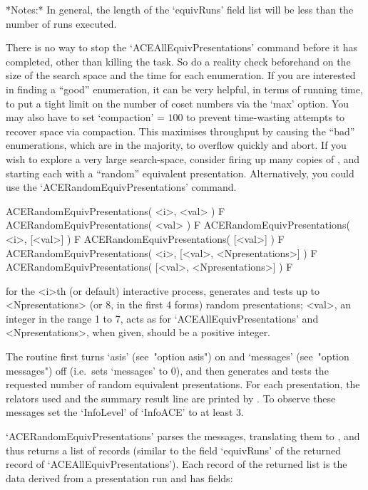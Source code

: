 \enditems

*Notes:*
In general, the length of the `equivRuns' field list will be less than
the number of runs executed.

There is no way to stop the `ACEAllEquivPresentations' command  before
it has completed, other than killing the task. So do a  reality  check
beforehand on the size of the search  space  and  the  time  for  each
enumeration. If you are interested in finding a ``good''  enumeration,
it can be very helpful, in terms of running time, to put a tight limit
on the number of coset numbers via the `max' option. You may also have
to set `compaction'  =  $100$  to  prevent  time-wasting  attempts  to
recover space via compaction. This maximises throughput by causing the
``bad'' enumerations, which are in the majority, to  overflow  quickly
and abort. If you wish to explore a very large search-space,  consider
firing up many copies of {\ACE}, and starting each with  a  ``random''
equivalent   presentation.   Alternatively,   you   could   use    the
`ACERandomEquivPresentations' command.


\>ACERandomEquivPresentations( <i>, <val> ) F
\>ACERandomEquivPresentations( <val> ) F
\>ACERandomEquivPresentations( <i>, [<val>] ) F
\>ACERandomEquivPresentations( [<val>] ) F
\>ACERandomEquivPresentations( <i>, [<val>, <Npresentations>] ) F
\>ACERandomEquivPresentations( [<val>, <Npresentations>] ) F

for the <i>th (or default) interactive {\ACE} process,  generates  and
tests up to <Npresentations> (or 8,  in  the  first  4  forms)  random
presentations; <val>, an integer in the range 1  to  7,  acts  as  for
`ACEAllEquivPresentations' and <Npresentations>, when given, should be
a positive integer.

The routine first turns `asis' (see~"option asis") on  and  `messages'
(see~"option messages") off (i.e.~sets  `messages'  to  0),  and  then
generates  and  tests  the  requested  number  of  random   equivalent
presentations. For  each  presentation,  the  relators  used  and  the
summary result line are printed by {\ACE}. To observe  these  messages
set the `InfoLevel' of `InfoACE' to at least 3.

`ACERandomEquivPresentations' parses the {\ACE} messages,  translating
them to {\GAP}, and thus returns a list of  records  (similar  to  the
field     `equivRuns'     of     the      returned      record      of
`ACEAllEquivPresentations'). Each record of the returned list  is  the
data derived from a presentation run and has fields:


